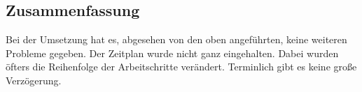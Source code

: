\subsection{Zusammenfassung}
Bei der Umsetzung hat es, abgesehen von den oben angeführten, keine weiteren Probleme gegeben. Der Zeitplan wurde nicht ganz eingehalten. Dabei wurden öfters die Reihenfolge der Arbeitschritte verändert. Terminlich gibt es keine große Verzögerung.